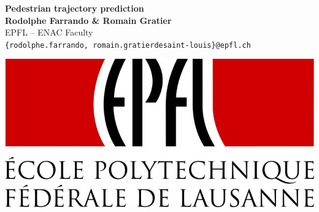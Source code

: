 \documentclass[a0,portrait]{a0poster}
\begin{document}


\begin{minipage}[b]{0.75\linewidth}
\veryHuge \color{NavyBlue} \textbf{Pedestrian trajectory prediction} \color{Black}\\ %
\huge \textbf{Rodolphe Farrando \& Romain Gratier}\\[0.5cm] %
\huge EPFL -- ENAC Faculty\\[0.4cm] %
\Large \texttt{\{rodolphe.farrando, romain.gratierdesaint-louis\}@epfl.ch}\\
\end{minipage}
%
\begin{minipage}[b]{0.25\linewidth}
\includegraphics[width=20cm]{./figure/epfl_logo.jpg}\\
\end{minipage}

\vspace{1cm} %

\end{document}
